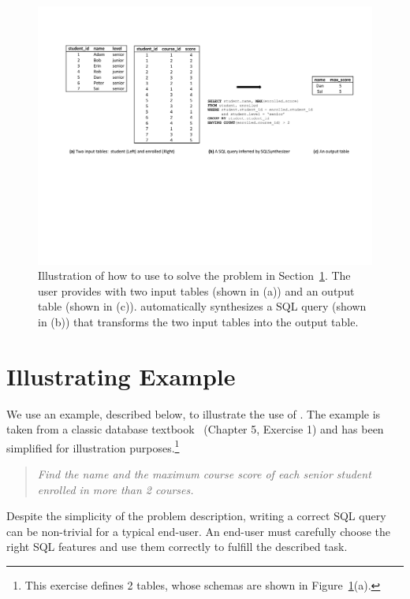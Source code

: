
\begin{figure}[t]
  \centering
  \includegraphics[scale=0.73]{motivating}
  \vspace*{-2.0ex}\caption {{\label{fig:motivating}
  Illustration of how to use \ourtool to solve the problem in Section~\ref{sec:example}.
  The user provides \ourtool with
  two input tables (shown in (a)) and an output table (shown in (c)).
  \ourtool automatically synthesizes a SQL query (shown in (b)) that
  transforms the two input tables into the output table.
}}
\vspace{-1mm}
\end{figure}

\section{Illustrating Example}
\label{sec:example}

\vspace{-1mm}

We use an example, described below, to illustrate the use
of \ourtool. The example is taken from a classic
database textbook~\cite{cowbook} (Chapter 5, Exercise 1)
and has been simplified for illustration purposes.\footnote{
This exercise defines 2 tables, whose
schemas are shown in Figure~\ref{fig:motivating}(a).}

\begin{quote}
\textit{Find the name and the maximum course score of each senior student
enrolled in more than 2 courses.}
\end{quote}

Despite the simplicity of the problem description,
writing a correct SQL query  can be non-trivial for a typical
end-user. An end-user must carefully choose the
right SQL features and use them correctly
to fulfill the described task.


